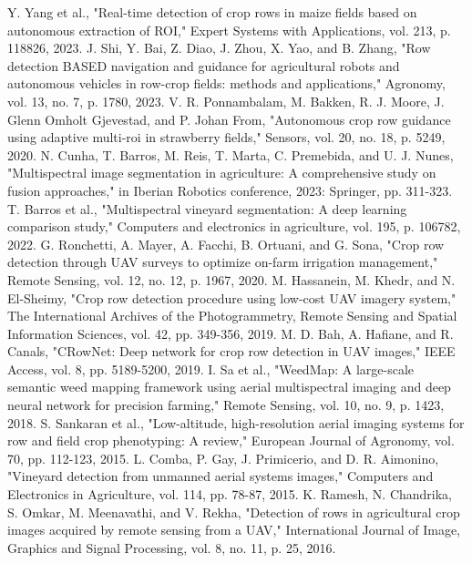 \documentclass[conference]{IEEEtran}
\begin{document}
	
	\begin{thebibliography}{00}
		 Y. Yang et al., "Real-time detection of crop rows in maize fields based on autonomous extraction of ROI," Expert Systems with Applications, vol. 213, p. 118826, 2023.
		 J. Shi, Y. Bai, Z. Diao, J. Zhou, X. Yao, and B. Zhang, "Row detection BASED navigation and guidance for agricultural robots and autonomous vehicles in row-crop fields: methods and applications," Agronomy, vol. 13, no. 7, p. 1780, 2023.
		 V. R. Ponnambalam, M. Bakken, R. J. Moore, J. Glenn Omholt Gjevestad, and P. Johan From, "Autonomous crop row guidance using adaptive multi-roi in strawberry fields," Sensors, vol. 20, no. 18, p. 5249, 2020.
		 N. Cunha, T. Barros, M. Reis, T. Marta, C. Premebida, and U. J. Nunes, "Multispectral image segmentation in agriculture: A comprehensive study on fusion approaches," in Iberian Robotics conference, 2023: Springer, pp. 311-323.
		 T. Barros et al., "Multispectral vineyard segmentation: A deep learning comparison study," Computers and electronics in agriculture, vol. 195, p. 106782, 2022.
		 G. Ronchetti, A. Mayer, A. Facchi, B. Ortuani, and G. Sona, "Crop row detection through UAV surveys to optimize on-farm irrigation management," Remote Sensing, vol. 12, no. 12, p. 1967, 2020.
		 M. Hassanein, M. Khedr, and N. El-Sheimy, "Crop row detection procedure using low-cost UAV imagery system," The International Archives of the Photogrammetry, Remote Sensing and Spatial Information Sciences, vol. 42, pp. 349-356, 2019.
		 M. D. Bah, A. Hafiane, and R. Canals, "CRowNet: Deep network for crop row detection in UAV images," IEEE Access, vol. 8, pp. 5189-5200, 2019.
		 I. Sa et al., "WeedMap: A large-scale semantic weed mapping framework using aerial multispectral imaging and deep neural network for precision farming," Remote Sensing, vol. 10, no. 9, p. 1423, 2018.
		 S. Sankaran et al., "Low-altitude, high-resolution aerial imaging systems for row and field crop phenotyping: A review," European Journal of Agronomy, vol. 70, pp. 112-123, 2015.
		 L. Comba, P. Gay, J. Primicerio, and D. R. Aimonino, "Vineyard detection from unmanned aerial systems images," Computers and Electronics in Agriculture, vol. 114, pp. 78-87, 2015.
		 K. Ramesh, N. Chandrika, S. Omkar, M. Meenavathi, and V. Rekha, "Detection of rows in agricultural crop images acquired by remote sensing from a UAV," International Journal of Image, Graphics and Signal Processing, vol. 8, no. 11, p. 25, 2016.

\end{thebibliography}
\end{document}
